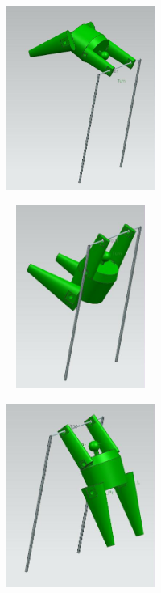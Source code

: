 \documentclass[12pt]{article}
\begin{document}
{	\begin{figure}[H]
		\begin{subfigure}{0.32\textwidth}
			\centering\includegraphics[height=6cm,width=1\textwidth,keepaspectratio]{var9_0.jpeg}
			\caption{}
			\label{fig:var9_0.jpeg}
		\end{subfigure}
		\begin{subfigure}{0.32\textwidth}
			\centering\includegraphics[height=6cm,width=1\textwidth,keepaspectratio]{var9_1.jpeg}
			\caption{}
			\label{fig:var9_1.jpeg}
		\end{subfigure}
		\begin{subfigure}{0.32\textwidth}
			\centering\includegraphics[height=6cm,width=1\textwidth,keepaspectratio]{var9_2.jpeg}
			\caption{}
			\label{fig:var9_2.jpeg}
		\end{subfigure}
	

\end{figure}}
\end{document}
